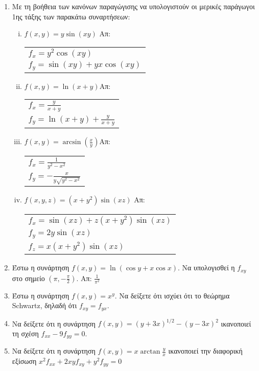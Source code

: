 \begin{enumerate}
    \item Με τη βοήθεια των κανόνων παραγώγισης να υπολογιστούν οι μερικές 
        παράγωγοι 1ης τάξης των παρακάτω συναρτήσεων:

        \begin{enumerate}[i)]
            \item $f(x,y)=y\sin (xy)$ \hfill Απ: \begin{tabular}{l}
                    $f_x=y^2\cos(xy)$ \\ 
                    $f_y=\sin(xy)+yx\cos(xy)$
                \end{tabular}

            \item $f(x,y)=\ln(x+y)$\hfill Απ: \begin{tabular}{l}
                    $f_x=\frac{y}{x+y}$ \\ 
                    $f_y=\ln(x+y)+\frac{y}{x+y}$
                \end{tabular}

            \item $f(x,y)=\arcsin(\frac{x}{y})$\hfill Απ: \begin{tabular}{l}
                    $f_x=\frac{1}{y^2-x^2}$ \\ 
                    $f_y=-\frac{x}{y\sqrt{y^2-x^2}}$
                \end{tabular}
            \item $ f(x,y,z) = (x+y^{2}) \sin{(xz)} $ \hfill Απ: \begin{tabular}{l}
                    $ f_{x} = \sin{(xz)} + z(x+y^{2}) \sin{(xz)} $ \\
                    $ f_{y} = 2y \sin{(xz)} $ \\
                    $ f_{z} = x(x+y^{2}) \sin{(xz)} $
                \end{tabular} 
        \end{enumerate}

    \item Έστω η συνάρτηση $f(x,y)=\ln\left(\cos y+x\cos x\right)$.  Να υπολογισθεί 
        η $ f_{xy} $ στο σημείο $\left(\pi,-\frac{\pi}{2}\right)$.
        \hfill Απ: $\frac{1}{\pi^2}$

    \item Έστω η συνάρτηση $ f(x,y) = x^{y} $. Να δείξετε ότι ισχύει ότι το θεώρημα 
        Schwartz, δηλαδή ότι $ f_{xy} = f_{yx} $.

    \item Να δείξετε ότι η συνάρτηση $ f(x,y) = (y+3x)^{1/2} - 
        (y-3x)^{2} $ ικανοποιεί τη σχέση $ f_{xx} - 9 f_{yy} = 0 $.

    \item Να δείξετε ότι η συνάρτηση $ f(x,y) = x \arctan{\frac{y}{x}} $ 
        ικανοποιεί την διαφορική εξίσωση $ x^{2} f_{xx} + 2xyf_{xy} + y^{2} f_{yy} = 0 $ 
\end{enumerate}


